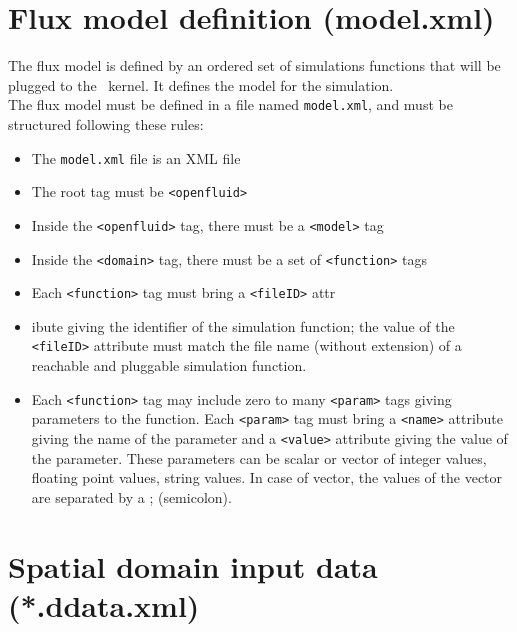 
\bigskip

\section{Flux model definition (model.xml)}

The flux model is defined by an ordered set of simulations functions that will be plugged to the \OFEname \ kernel.
It defines the model for the simulation.\\
\noindent The flux model must be defined in a file named \texttt{model.xml},
and must be structured following these rules:
\begin{itemize}
  \item The \texttt{model.xml} file is an XML file
  \item The root tag must be \texttt{<openfluid>}
  \item Inside the \texttt{<openfluid>} tag, there must be a \texttt{<model>} tag
  \item Inside the \texttt{<domain>} tag, there must be a set
  of \texttt{<function>} tags 
  \item Each \texttt{<function>} tag must bring a \texttt{<fileID>} attr\item ibute giving
  the identifier of the simulation function; the value of the \texttt{<fileID>} attribute must match the file name (without extension)
  of a reachable and pluggable simulation function.
  \item Each \texttt{<function>} tag may include zero to many \texttt{<param>} tags giving
  parameters to the function. Each \texttt{<param>} tag must bring a \texttt{<name>} attribute giving
  the name of the parameter and a \texttt{<value>} attribute giving the value of the parameter. These parameters can be scalar or vector of integer values, floating point values, string values. In case of vector, the values of the vector are separated by a ; (semicolon).  
\end{itemize}



\bigskip

\section{Spatial domain input data (*.ddata.xml)}

